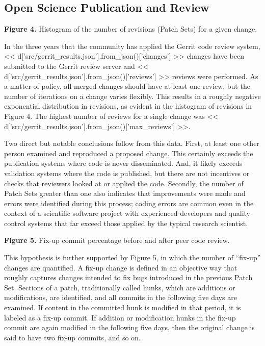 \documentclass{frontiersENG} %
\begin{document}
\subsection{Open Science Publication and Review}

\textbf{Figure 4. }{Histogram of the number of revisions (Patch Sets) for a
given change.}\label{fig:04}

In the three years that the community has applied the Gerrit code review
system, << d['src/gerrit_results.json'].from_json()['changes'] >> changes have
been submitted to the Gerrit review server and
<< d['src/gerrit_results.json'].from_json()['reviews'] >> reviews were performed.
As a matter of policy, all merged changes should have at least one review,
but the number of iterations on a change varies flexibly.
This results in a roughly negative exponential distribution in
revisions, as evident in the histogram of revisions in
Figure 4.  The highest number of reviews
for a single change was
<< d['src/gerrit_results.json'].from_json()['max_reviews'] >>.

Two direct but notable conclusions follow from this data. First, at least one
other person examined and reproduced a proposed change.  This certainly exceeds
the publication systems where code is never disseminated. And, it likely exceeds
validation systems where the code is published, but there are not incentives or
checks that reviewers looked at or applied the code.  Secondly, the number of
Patch Sets greater than one also indicates that improvements were made and
errors were identified during this process; coding errors are common even in
the context of a scientific software project with experienced developers and
quality control systems that far exceed those applied by the typical research
scientist.

\textbf{Figure 5. }{Fix-up commit percentage before and after peer code review.}
\label{fig:05}

This hypothesis is further supported by Figure 5, in which the number of
``fix-up'' changes are quantified. A fix-up change is defined in an objective
way that roughly captures changes intended to fix bugs introduced in the
previous Patch Set.  Sections of a patch, traditionally called hunks, which are
additions or modifications, are identified, and all commits in the following
five days are examined.  If content in the committed hunk is modified in that
period, it is labeled as a fix-up commit.  If addition or modification hunks
in the fix-up commit are again modified in the following five days, then the
original change is said to have two fix-up commits, and so on.
\end{document}
